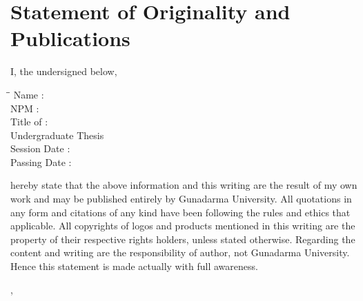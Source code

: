 
\begingroup
\let\clearpage\relax
\let\cleardoublepage\relax

\chapter*{Statement of Originality and Publications}
\label{chap:sig-statement}

I, the undersigned below,

\begin{tabbing}
\hspace*{4.2cm}\=\hspace*{0.5cm}\= \kill
Name \>:\> \myName \\
NPM \>:\> \myNPM \\
Title of \>:\> \myTitleLineOne \\
Undergraduate Thesis \>\> \myTitleLineTwo \\
Session Date \>:\> \myDateSession \\
Passing Date \>:\> \myDatePassing
\end{tabbing}

hereby state that the above information and this writing are the result of my own work and may be published entirely by Gunadarma University.
All quotations in any form and citations of any kind have been following the rules and ethics that applicable.
All copyrights of logos and products mentioned in this writing are the property of their respective rights holders, unless stated otherwise.
Regarding the content and writing are the responsibility of author, not Gunadarma University.
Hence this statement is made actually with full awareness.

\hfill

\begin{flushright}
\myCity, \myDateSession
\end{flushright}

\hfill

\begin{flushright}
\myName
\end{flushright}

\endgroup
